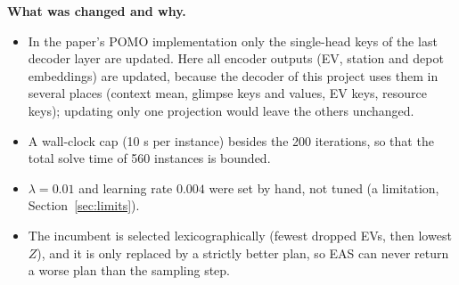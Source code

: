 \textbf{What was changed and why.}
\begin{itemize}
  \item In the paper's POMO implementation only the single-head keys of the last decoder layer are updated. Here all encoder outputs (EV, station and depot embeddings) are updated, because the decoder of this project uses them in several places (context mean, glimpse keys and values, EV keys, resource keys); updating only one projection would leave the others unchanged.
  \item A wall-clock cap (10 s per instance) besides the 200 iterations, so that the total solve time of 560 instances is bounded.
  \item $\lambda=0.01$ and learning rate $0.004$ were set by hand, not tuned (a limitation, Section~\ref{sec:limits}).
  \item The incumbent is selected lexicographically (fewest dropped EVs, then lowest $Z$), and it is only replaced by a strictly better plan, so EAS can never return a worse plan than the sampling step.
\end{itemize}
